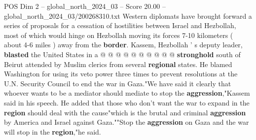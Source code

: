 \begin{textsample}{POS Dim 2 – global\_north\_2024\_03 – Score 20.00 – global\_north\_2024\_03/200268310.txt}
Western diplomats have brought forward a series of proposals for a cessation of hostilities between Israel and Hezbollah, most of which would hinge on Hezbollah moving its forces 7-10 kilometers ( about 4-6 miles ) away from the \textbf{border}.
Kassem, Hezbollah ' s deputy leader, \textbf{blasted} the United States in a @ @ @ @ @ @ @ @ @ @ \textbf{stronghold} south of Beirut attended by Muslim clerics from several \textbf{regional} states.
He blamed Washington for using its veto power three times to prevent resolutions at the U.N.
Security Council to end the war in Gaza."We have said it clearly that whoever wants to be a mediator should mediate to stop the \textbf{aggression},"Kassem said in his speech.
He added that those who don't want the war to expand in the \textbf{region} should deal with the cause"which is the brutal and criminal \textbf{aggression} by America and Israel against Gaza.""Stop the \textbf{aggression} on Gaza and the war will stop in the \textbf{region},"he said.

\end{textsample}
